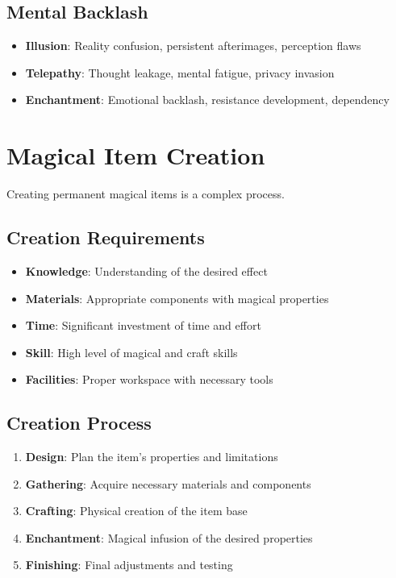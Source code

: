 \begin{multicols}{2}
\subsection*{Mental Backlash}
\begin{itemize}
\item \textbf{Illusion}: Reality confusion, persistent afterimages, perception flaws
\item \textbf{Telepathy}: Thought leakage, mental fatigue, privacy invasion
\item \textbf{Enchantment}: Emotional backlash, resistance development, dependency
\end{itemize}

\section{Magical Item Creation} 

Creating permanent magical items is a complex process.

\subsection*{Creation Requirements}
\begin{itemize}
\item \textbf{Knowledge}: Understanding of the desired effect
\item \textbf{Materials}: Appropriate components with magical properties
\item \textbf{Time}: Significant investment of time and effort
\item \textbf{Skill}: High level of magical and craft skills
\item \textbf{Facilities}: Proper workspace with necessary tools
\end{itemize}

\subsection*{Creation Process}
\begin{enumerate}
\item \textbf{Design}: Plan the item's properties and limitations
\item \textbf{Gathering}: Acquire necessary materials and components
\item \textbf{Crafting}: Physical creation of the item base
\item \textbf{Enchantment}: Magical infusion of the desired properties
\item \textbf{Finishing}: Final adjustments and testing
\end{enumerate}


\end{multicols}
